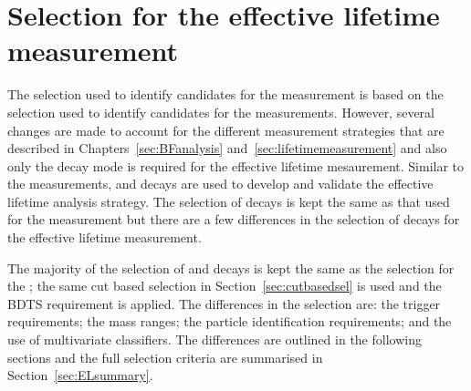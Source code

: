\section{Selection for the effective lifetime measurement}
\label{sec:ELsel}
The selection used to identify candidates for the \el measurement is based on the selection used to identify candidates for the \BF measurements. However, several changes are made to account for the different measurement strategies that are described in Chapters~\ref{sec:BFanalysis} and~\ref{sec:lifetimemeasurement} and also only the \bs decay mode is required for the effective lifetime mesaurement. 
Similar to the \BF measurements, \bhh and \bsjpsiphi decays are used to develop and validate the effective lifetime analysis strategy. The selection of \bsjpsiphi decays is kept the same as that used for the \BF measurement but there are a few differences in the selection of \bhh decays for the effective lifetime measurement.

The majority of the selection of \bsmumu and \bhh decays is kept the same as the selection for the \BFm; the same cut based selection in Section~\ref{sec:cutbasedsel} is used and the BDTS requirement is applied.   
The differences in the selection are: the trigger requirements; the mass ranges; the particle identification requirements; and the use of multivariate classifiers. The differences are outlined in the following sections and the full selection criteria are summarised in Section~\ref{sec:ELsummary}.


